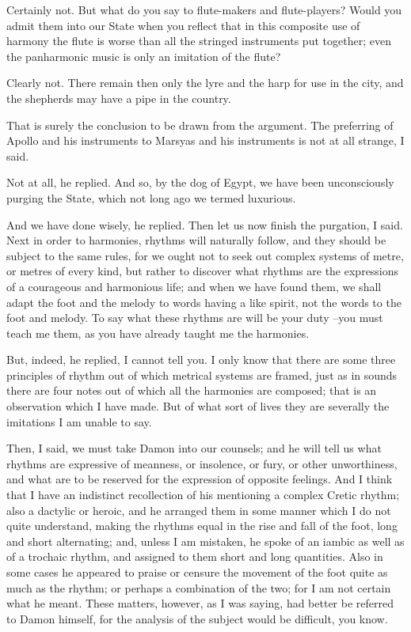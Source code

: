 Certainly not.
But what do you say to flute-makers and flute-players? Would you admit them into our State when you reflect that in this composite use of harmony the flute is worse than all the stringed instruments put together; even the panharmonic music is only an imitation of the flute?

Clearly not.
There remain then only the lyre and the harp for use in the city, and the shepherds may have a pipe in the country.

That is surely the conclusion to be drawn from the argument.
The preferring of Apollo and his instruments to Marsyas and his instruments is not at all strange, I said.

Not at all, he replied.
And so, by the dog of Egypt, we have been unconsciously purging the State, which not long ago we termed luxurious.

And we have done wisely, he replied.
Then let us now finish the purgation, I said. Next in order to harmonies, rhythms will naturally follow, and they should be subject to the same rules, for we ought not to seek out complex systems of metre, or metres of every kind, but rather to discover what rhythms are the expressions of a courageous and harmonious life; and when we have found them, we shall adapt the foot and the melody to words having a like spirit, not the words to the foot and melody. To say what these rhythms are will be your duty --you must teach me them, as you have already taught me the harmonies.

But, indeed, he replied, I cannot tell you. I only know that there are some three principles of rhythm out of which metrical systems are framed, just as in sounds there are four notes out of which all the harmonies are composed; that is an observation which I have made. But of what sort of lives they are severally the imitations I am unable to say.

Then, I said, we must take Damon into our counsels; and he will tell us what rhythms are expressive of meanness, or insolence, or fury, or other unworthiness, and what are to be reserved for the expression of opposite feelings. And I think that I have an indistinct recollection of his mentioning a complex Cretic rhythm; also a dactylic or heroic, and he arranged them in some manner which I do not quite understand, making the rhythms equal in the rise and fall of the foot, long and short alternating; and, unless I am mistaken, he spoke of an iambic as well as of a trochaic rhythm, and assigned to them short and long quantities. Also in some cases he appeared to praise or censure the movement of the foot quite as much as the rhythm; or perhaps a combination of the two; for I am not certain what he meant. These matters, however, as I was saying, had better be referred to Damon himself, for the analysis of the subject would be difficult, you know.

